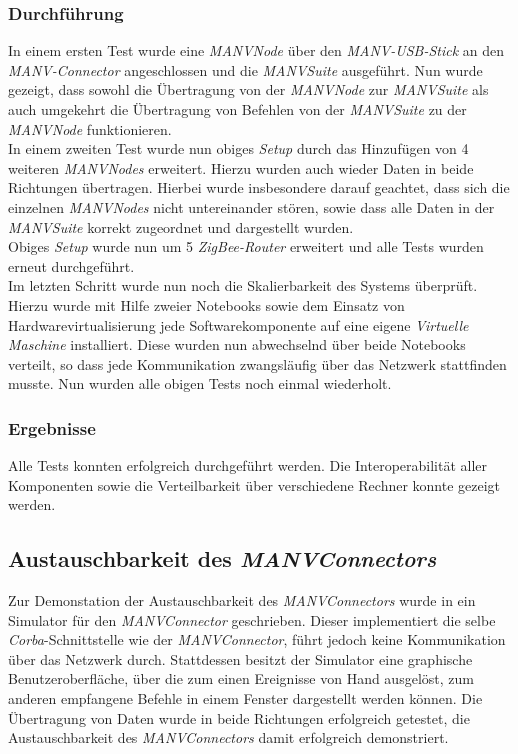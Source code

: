 \subsubsection{Durchführung}
In einem ersten Test wurde eine \emph{MANVNode} über den \emph{MANV-USB-Stick} an den \emph{MANV-Connector}
angeschlossen und die \emph{MANVSuite} ausgeführt. Nun wurde gezeigt, dass sowohl die Übertragung von der \emph{MANVNode}
zur \emph{MANVSuite} als auch umgekehrt die Übertragung von Befehlen von der \emph{MANVSuite} zu der \emph{MANVNode}
funktionieren.\\
In einem zweiten Test wurde nun obiges \emph{Setup} durch das Hinzufügen von 4 weiteren \emph{MANVNodes} erweitert. Hierzu
wurden auch wieder Daten in beide Richtungen übertragen. Hierbei wurde insbesondere darauf geachtet, dass sich die
einzelnen \emph{MANVNodes} nicht untereinander stören, sowie dass alle Daten in der \emph{MANVSuite} korrekt zugeordnet
und dargestellt wurden.\\
Obiges \emph{Setup} wurde nun um 5 \emph{ZigBee-Router} erweitert und alle Tests wurden erneut durchgeführt.\\
Im letzten Schritt wurde nun noch die Skalierbarkeit des Systems überprüft. Hierzu wurde mit Hilfe zweier Notebooks
sowie dem Einsatz von Hardwarevirtualisierung jede Softwarekomponente auf eine eigene \emph{Virtuelle Maschine} installiert. Diese
wurden nun abwechselnd über beide Notebooks verteilt, so dass jede Kommunikation zwangsläufig über das Netzwerk
stattfinden musste. Nun wurden alle obigen Tests noch einmal wiederholt.

\subsubsection{Ergebnisse}
Alle Tests konnten erfolgreich durchgeführt werden. Die Interoperabilität aller Komponenten sowie die Verteilbarkeit
über verschiedene Rechner konnte gezeigt werden.

\subsection{Austauschbarkeit des \emph{MANVConnectors}}
Zur Demonstation der Austauschbarkeit des \emph{MANVConnectors} wurde in \cite{Jan} ein Simulator für den 
\emph{MANVConnector} geschrieben. Dieser implementiert die selbe \emph{Corba}-Schnittstelle wie der 
\emph{MANVConnector}, führt jedoch keine Kommunikation über das Netzwerk durch. Stattdessen besitzt
der Simulator eine graphische Benutzeroberfläche, über die zum einen Ereignisse von Hand ausgelöst, zum
anderen empfangene Befehle in einem Fenster dargestellt werden können. Die Übertragung von Daten wurde
in beide Richtungen erfolgreich getestet, die Austauschbarkeit des \emph{MANVConnectors} damit
erfolgreich demonstriert.

